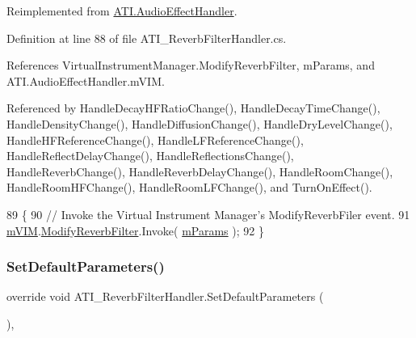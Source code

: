 Reimplemented from \hyperlink{class_a_t_i_1_1_audio_effect_handler_aab43cfccb835b9630456eb4590626e6d}{A\+T\+I.\+Audio\+Effect\+Handler}.



Definition at line 88 of file A\+T\+I\+\_\+\+Reverb\+Filter\+Handler.\+cs.



References Virtual\+Instrument\+Manager.\+Modify\+Reverb\+Filter, m\+Params, and A\+T\+I.\+Audio\+Effect\+Handler.\+m\+V\+IM.



Referenced by Handle\+Decay\+H\+F\+Ratio\+Change(), Handle\+Decay\+Time\+Change(), Handle\+Density\+Change(), Handle\+Diffusion\+Change(), Handle\+Dry\+Level\+Change(), Handle\+H\+F\+Reference\+Change(), Handle\+L\+F\+Reference\+Change(), Handle\+Reflect\+Delay\+Change(), Handle\+Reflections\+Change(), Handle\+Reverb\+Change(), Handle\+Reverb\+Delay\+Change(), Handle\+Room\+Change(), Handle\+Room\+H\+F\+Change(), Handle\+Room\+L\+F\+Change(), and Turn\+On\+Effect().


\begin{DoxyCode}
89     \{
90         \textcolor{comment}{// Invoke the Virtual Instrument Manager's ModifyReverbFiler event.}
91         \hyperlink{class_a_t_i_1_1_audio_effect_handler_a6b5b6149cc376ff0f750ade08ba23bce}{mVIM}.\hyperlink{group___v_i_m_events_gaadd137e073cb3849f610a46e0d032858}{ModifyReverbFilter}.Invoke( \hyperlink{class_a_t_i___reverb_filter_handler_a034260fbce2052b42bceddc891632347}{mParams} );
92     \}
\end{DoxyCode}
\mbox{\label{class_a_t_i___reverb_filter_handler_a69a75dcda06ae1597030e0ceaf84e1ae}} 
\subsubsection{\texorpdfstring{Set\+Default\+Parameters()}{SetDefaultParameters()}}
{\footnotesize\ttfamily override void A\+T\+I\+\_\+\+Reverb\+Filter\+Handler.\+Set\+Default\+Parameters (\begin{DoxyParamCaption}{ }\end{DoxyParamCaption})\hspace{0.3cm}{\ttfamily [protected]}, {\ttfamily [virtual]}}



